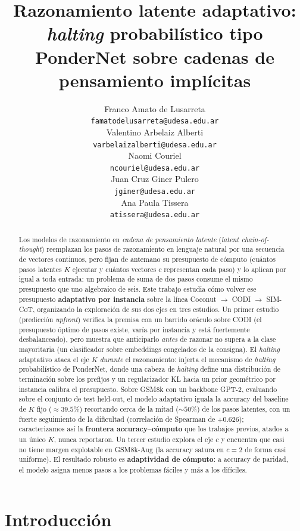 \documentclass[11pt]{article}
\title{Razonamiento latente adaptativo: \textit{halting} probabilístico tipo PonderNet sobre cadenas de pensamiento implícitas}
\author{Franco Amato de Lusarreta \\
  \texttt{famatodelusarreta@udesa.edu.ar} \\\And
  Valentino Arbelaiz Alberti \\
  \texttt{varbelaizalberti@udesa.edu.ar} \\\AND
  Naomi Couriel \\
  \texttt{ncouriel@udesa.edu.ar} \\\And
  Juan Cruz Giner Pulero \\
  \texttt{jginer@udesa.edu.ar} \\\AND
  Ana Paula Tissera \\
  \texttt{atissera@udesa.edu.ar} \\}
\begin{document}
\maketitle

\begin{abstract}
Los modelos de razonamiento en \emph{cadena de pensamiento latente} (\textit{latent chain-of-thought}) reemplazan los pasos de razonamiento en lenguaje natural por una secuencia de vectores continuos, pero fijan de antemano su presupuesto de cómputo (cuántos pasos latentes $K$ ejecutar y cuántos vectores $c$ representan cada paso) y lo aplican por igual a toda entrada: un problema de suma de dos pasos consume el mismo presupuesto que uno algebraico de seis. Este trabajo estudia cómo volver ese presupuesto \textbf{adaptativo por instancia} sobre la línea Coconut $\rightarrow$ CODI $\rightarrow$ SIM-CoT, organizando la exploración de sus dos ejes en tres estudios. Un primer estudio (predicción \emph{upfront}) verifica la premisa con un barrido oráculo sobre CODI (el presupuesto óptimo de pasos existe, varía por instancia y está fuertemente desbalanceado), pero muestra que anticiparlo \emph{antes} de razonar no supera a la clase mayoritaria (un clasificador sobre embeddings congelados de la consigna). El \emph{halting} adaptativo ataca el eje $K$ \emph{durante} el razonamiento: injerta el mecanismo de \textit{halting} probabilístico de PonderNet, donde una cabeza de \textit{halting} define una distribución de terminación sobre los prefijos y un regularizador KL hacia un prior geométrico por instancia calibra el presupuesto. Sobre GSM8k con un backbone GPT-2, evaluando sobre el conjunto de test held-out, el modelo adaptativo iguala la accuracy del baseline de $K$ fijo ($\approx 39.5\%$) recortando cerca de la mitad ($\sim 50\%$) de los pasos latentes, con un fuerte seguimiento de la dificultad (correlación de Spearman de $+0.626$); caracterizamos así la \textbf{frontera accuracy--cómputo} que los trabajos previos, atados a un único $K$, nunca reportaron. Un tercer estudio explora el eje $c$ y encuentra que casi no tiene margen explotable en GSM8k-Aug (la accuracy satura en $c{=}2$ de forma casi uniforme). El resultado robusto es \textbf{adaptividad de cómputo}: a accuracy de paridad, el modelo asigna menos pasos a los problemas fáciles y más a los difíciles.
\end{abstract}

\section{Introducción}
\end{document}

